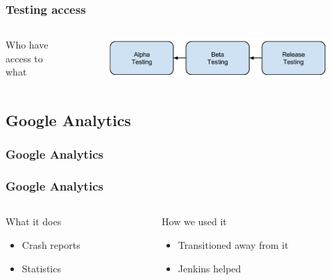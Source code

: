 \begin{frame}
	\begin{center}
		\frametitle{Testing access}
		\begin{columns} %
			\begin{column}{.3\textwidth}
				Who have access to what
			\end{column}%
			\begin{column}{.80\textwidth}
				\begin{figure}[H]
					\centering
					\includegraphics[width= 0.8 \textwidth]{pictures/Access.png}
				\end{figure}
			\end{column}%
		\end{columns}
	\end{center}
\end{frame}

\subsection{Google Analytics}
\begin{frame}
	\frametitle{Google Analytics}
\end{frame}

\begin{frame}
	\begin{center}
		\frametitle{Google Analytics}
		\begin{columns} %
			\begin{column}{.3\textwidth}
				What it does
				\begin{itemize}
					\item Crash reports
					\item Statistics
				\end{itemize}
			\end{column}%
			\begin{column}{.3\textwidth}
				How we used it
				\begin{itemize}
					\item Transitioned away from it 
					\item Jenkins helped
				\end{itemize}
			\end{column}%
		\end{columns}
	\end{center}
\end{frame}


